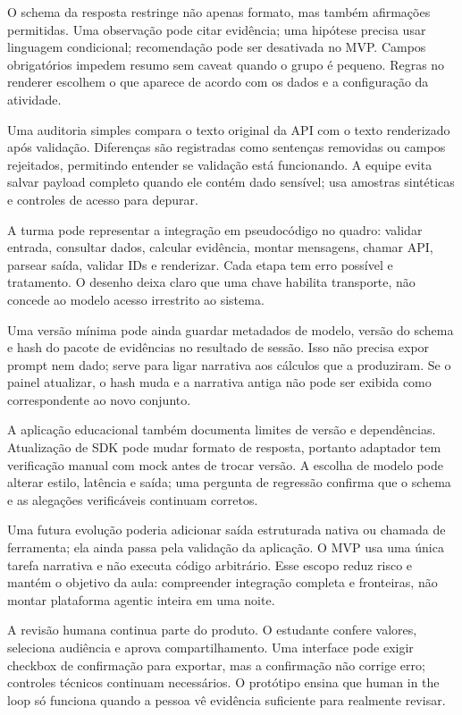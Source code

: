 O schema da resposta restringe não apenas formato, mas também afirmações permitidas. Uma observação pode citar evidência; uma hipótese precisa usar linguagem condicional; recomendação pode ser desativada no MVP. Campos obrigatórios impedem resumo sem caveat quando o grupo é pequeno. Regras no renderer escolhem o que aparece de acordo com os dados e a configuração da atividade.

Uma auditoria simples compara o texto original da API com o texto renderizado após validação. Diferenças são registradas como sentenças removidas ou campos rejeitados, permitindo entender se validação está funcionando. A equipe evita salvar payload completo quando ele contém dado sensível; usa amostras sintéticas e controles de acesso para depurar.

A turma pode representar a integração em pseudocódigo no quadro: validar entrada, consultar dados, calcular evidência, montar mensagens, chamar API, parsear saída, validar IDs e renderizar. Cada etapa tem erro possível e tratamento. O desenho deixa claro que uma chave habilita transporte, não concede ao modelo acesso irrestrito ao sistema.

Uma versão mínima pode ainda guardar metadados de modelo, versão do schema e hash do pacote de evidências no resultado de sessão. Isso não precisa expor prompt nem dado; serve para ligar narrativa aos cálculos que a produziram. Se o painel atualizar, o hash muda e a narrativa antiga não pode ser exibida como correspondente ao novo conjunto.

A aplicação educacional também documenta limites de versão e dependências. Atualização de SDK pode mudar formato de resposta, portanto adaptador tem verificação manual com mock antes de trocar versão. A escolha de modelo pode alterar estilo, latência e saída; uma pergunta de regressão confirma que o schema e as alegações verificáveis continuam corretos.

Uma futura evolução poderia adicionar saída estruturada nativa ou chamada de ferramenta; ela ainda passa pela validação da aplicação. O MVP usa uma única tarefa narrativa e não executa código arbitrário. Esse escopo reduz risco e mantém o objetivo da aula: compreender integração completa e fronteiras, não montar plataforma agentic inteira em uma noite.

A revisão humana continua parte do produto. O estudante confere valores, seleciona audiência e aprova compartilhamento. Uma interface pode exigir checkbox de confirmação para exportar, mas a confirmação não corrige erro; controles técnicos continuam necessários. O protótipo ensina que human in the loop só funciona quando a pessoa vê evidência suficiente para realmente revisar.


